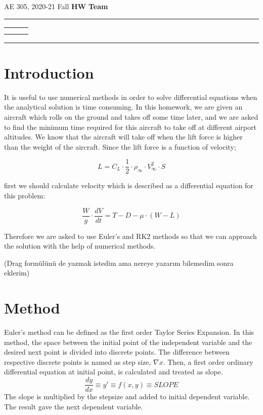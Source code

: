 \documentclass[letterpaper,12pt]{article}
\begin{document}
\begin{center}
AE 305, 2020-21 Fall \hfill \textbf{HW \HWno} \hfill \textbf{Team \TeamNo} \\
\noindent\rule{\textwidth}{0.4pt}
\begin{tabular}{p{} | p{} | p{} }
	\AuthorOneName&\AuthorTwoName&\AuthorThreeName\\
	\textit{\AuthorOneID}&\textit{\AuthorTwoID}&\textit{\AuthorThreeID}
\end{tabular}
\noindent\rule{\textwidth}{0.4pt}
\end{center}


\section{Introduction}

It is useful to use numerical methods in order to solve differential equations when
the analytical solution is time consuming. In this homework, we are given an aircraft
which rolls on the ground and takes off some time later, and we are asked to find
the minimum time required for this aircraft to take off at different airport altitudes.
We know that the aircraft will take off when the lift force is higher than the weight of
the aircraft. Since the lift force is a function of velocity;

\begin{equation}
        L = C_L \cdot \frac{1}{2} \cdot \rho_{\infty} \cdot V_{\infty}^{2} \cdot S
\end{equation}

first we should calculate velocity which is described as a differential equation for
this problem:

\begin{equation}
        \frac{W}{g} \cdot \frac{dV}{dt} = T - D - \mu \cdot (W - L)
\end{equation}

Therefore we are asked to use Euler's and RK2 methods so that we can approach the
solution with the help of numerical methods.

(Drag formülünü de yazmak istedim ama nereye yazarım bilemedim sonra eklerim)

\section{Method}
Euler's method can be defined as the first order Taylor Series Expansion. In this method, the space between
the initial point of the independent variable and the desired next point is divided into discrete points. The 
difference between respective discrete points is named as step size, $\nabla x$. Then, a first order ordinary
differential equation at initial point, is calculated and treated as slope.
\begin{equation}
\frac{dy}{dx} \equiv y \prime \equiv f(x,y) \equiv SLOPE
\end{equation}
The slope is multiplied by the stepsize
and added to initial dependent variable. The result gave the next dependent variable.
\end{document}
